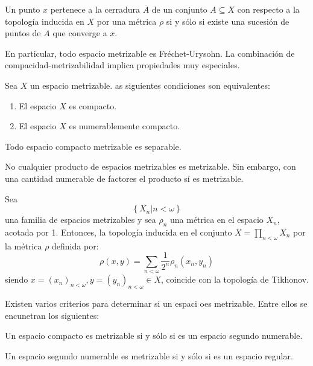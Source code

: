 \documentclass[12pt]{report}
\theoremstyle{largebreak}
\begin{document}
    \begin{theor}
        Un punto $x$ pertenece a la cerradura $\overline{A}$ de un conjunto $A\subseteq X$ con respecto a la topología inducida en $X$ por una métrica $\rho$ si y sólo si existe una sucesión de puntos de $A$ que converge a $x$.
    \end{theor}

    En particular, todo espacio metrizable es Fréchet-Urysohn. La combinación de compacidad-metrizabilidad implica propiedades muy especiales.

    \begin{theor}
        Sea $X$ un espacio metrizable. as siguientes condiciones son equivalentes:
        \begin{enumerate}
            \item El espacio $X$ es compacto.
            \item El espacio $X$ es numerablemente compacto.
        \end{enumerate}
    \end{theor}

    \begin{theor}
        Todo espacio compacto metrizable es separable.
    \end{theor}

    No cualquier producto de espacios metrizables es metrizable. Sin embargo, con una cantidad numerable de factores el producto sí es metrizable.

    \begin{theor}
        Sea
        \begin{equation*}
            \left\{X_n\Big|n<\omega \right\}
        \end{equation*}
        una familia de espacios metrizables y sea $\rho_n$ una métrica en el espacio $X_n$, acotada por 1. Entonces, la topología inducida en el conjunto $X=\prod_{n<\omega}X_n$ por la métrica $\rho$ definida por:
        \begin{equation*}
            \rho(x,y)=\sum_{n<\omega}\frac{1}{2^n}\rho_n(x_n,y_n)
        \end{equation*}
        siendo $x=\left(x_n\right)_{n<\omega},y=\left(y_n\right)_{n<\omega}\in X$, coincide con la topología de Tikhonov.
    \end{theor}
    
    Existen varios criterios para determinar si un espaci oes metrizable. Entre ellos se encunetran los siguientes:
    
    \begin{theor}
        Un espacio compacto es metrizable si y sólo si es un espacio segundo numerable.

        Un espacio segundo numerable es metrizable si y sólo si es un espacio regular.
    \end{theor}
\end{document}
